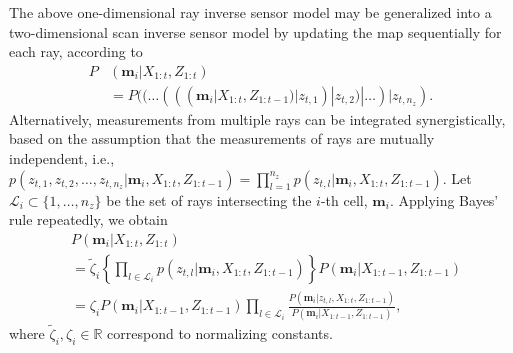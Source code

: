 \documentclass[letterpaper, 10pt, conference]{ieeeconf}
\newcommand{\braces}[1]{\ensuremath{\left\{ #1 \right\}}}
\renewcommand{\Re}{\ensuremath{\mathbb{R}}}
\begin{document}
The above one-dimensional ray inverse sensor model may be generalized into a two-dimensional scan inverse sensor model by updating the map sequentially for each ray, according to
\begin{align}
P&(\mathbf{m}_i|X_{1:t},Z_{1:t})\nonumber\\&%
=P((\dots(((\mathbf{m}_i|X_{1:t},Z_{1:t-1})|z_{t,1})|z_{t,2})|\ldots)|z_{t,n_z}).
\end{align}
Alternatively, measurements from multiple rays can be integrated synergistically, based on the assumption that the measurements of rays are mutually independent, i.e., $p(z_{t,1},z_{t,2},\ldots,z_{t,n_z}|\mathbf{m}_i,X_{1:t},Z_{1:t-1})=\prod_{l=1}^{n_z}p(z_{t,l}|\mathbf{m}_i,X_{1:t},Z_{1:t-1})$.
Let $\mathcal L_i\subset\{1,\ldots, n_z\}$ be the set of rays intersecting the $i$-th cell, $\mathbf{m}_i$. Applying Bayes' rule repeatedly, we obtain
\begin{align}
&P(\mathbf{m}_i|X_{1:t},Z_{1:t})\nonumber\\
&=\tilde\zeta_i\braces{\prod_{l\in\mathcal{L}_i}p(z_{t,l}|\mathbf{m}_i,X_{1:t},Z_{1:t-1})}P(\mathbf{m}_i|X_{1:t-1},Z_{1:t-1})\nonumber\\
%
&=
\zeta_i P(\mathbf{m}_i|X_{1:t-1},Z_{1:t-1})%
\prod_{l\in\mathcal{L}_i}\frac{P(\mathbf{m}_i|z_{t,l},X_{1:t},Z_{1:t-1})}{P(\mathbf{m}_i|X_{1:t-1},Z_{1:t-1})},
\label{eqn:ThirdBayesRule}
\end{align}
where $\tilde\zeta_i,\zeta_i\in\Re$ correspond to normalizing constants.%
\end{document}

